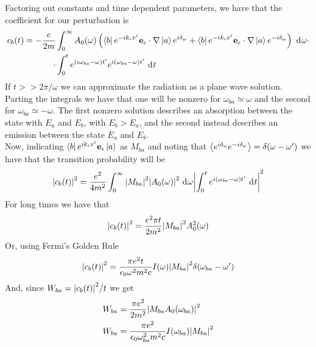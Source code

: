 \documentclass[../qm.tex]{subfiles}
\begin{document}
	Factoring out constants and time dependent parameters, we have that the coefficient for our perturbation is
	\begin{equation}
		\begin{aligned}
			c_b(t)=-\frac{e}{2m}&\int_{0}^{\infty}A_0(\omega)\left( \bra{b}e^{-ik_ix^i}\mathbf{e}_{\epsilon}\cdot\nabla\ket{a}e^{i\delta_{\omega}}+\bra{b}e^{-ik_ix^i}\mathbf{e}_{\epsilon}\cdot\nabla\ket{a}e^{-i\delta_{\omega}} \right)\ \mathrm{d}^{}\omega\cdot\\
			\cdot&\int_{0}^{t}e^{(i\omega_{ba}-\omega)t'}e^{i(\omega_{ba}-\omega)t'}\ \mathrm{d}^{}t
		\end{aligned}
		\label{eq:transitionprobqem}
	\end{equation}
	If $t>>2\pi/\omega$ we can approximate the radiation as a plane wave solution. Parting the integrals we have that one will be nonzero for $\omega_{ba}\simeq\omega$ and the second for $\omega_{ba}\simeq-\omega$. The first nonzero solution describes an absorption between the state with $E_{a}$ and $E_b$, with $E_b>E_a$, and the second instead describes an emission between the state $E_a$ and $E_b$.\\
	Now, indicating $\bra{b}e^{ik_ix^i}\mathbf{e}_{\epsilon}\ket{a}$ as $M_{ba}$ and noting that $\expval{e^{i\delta_{\omega}}e^{-i\delta_{\omega}}}=\delta(\omega-\omega')$ we have that the transition probability will be
	\begin{equation}
		\abs{c_b(t)}^2=\frac{e^2}{4m^2}\int_{0}^{\infty}\abs{M_{ba}}^2\abs{A_0(\omega)}^2\ \mathrm{d}^{}\omega\abs{\int_{0}^{t}e^{i(\omega_{ba}-\omega)t'}\ \mathrm{d}^{}t}^2
		\label{eq:transprob}
	\end{equation}
	For long times we have that
	\begin{equation*}
		\abs{c_b(t)}^2=\frac{e^2\pi t}{2m^2}\abs{M_{ba}}^2A_0^2(\omega)
	\end{equation*}
	Or, using Fermi's Golden Rule
	\begin{equation}
		\abs{c_b(t)}^2=\frac{\pi e^2t}{\epsilon_0\omega^2m^2c}I(\omega)\abs{M_{ba}}^2\delta(\omega_{ba}-\omega')
		\label{eq:transprobfermi}
	\end{equation}
	And, since $W_{ba}=\abs{c_b(t)}^2/t$ we get
	\begin{equation}
		\begin{aligned}
			W_{ba}&=\frac{\pi e^2}{2m^2}\abs{M_{ba}A_0(\omega_{ba})}^2\\
			W_{ba}&=\frac{\pi e^2}{\epsilon_0\omega_{ba}^2m^2c}I(\omega_{ba})\abs{M_{ba}}^2
		\end{aligned}
		\label{eq:perttransem}
	\end{equation}
\end{document}
